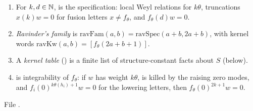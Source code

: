\begin{definition}\label{l26:def:ravfam}
\leavevmode
\begin{enumerate}
\item[(a)] For $k,d\in{\mathbb{N}}$,  is the specification: local Weyl relations for $k\theta$, truncations
$x(k)w=0$ for fusion letters $x\neq f_\theta$, and $f_\theta(d)w=0$.
\item[(b)] \emph{Ravinder's family} is $\mathrm{ravFam}(a,b)=\mathrm{ravSpec}(a+b,2a+b)$, with kernel words
$\mathrm{ravKw}(a,b)=[f_\theta(2a+b+1)]$.
\item[(c)] A \emph{kernel table} () is a finite list of structure-constant facts about $S$ (below).
\item[(d)] \textbf{} is integrability of $f_\theta$: if $w$ has weight $k\theta$, is killed by the raising
zero modes, and $f_i(0)^{k\theta(h_i)+1}w=0$ for the lowering letters, then $f_\theta(0)^{2k+1}w=0$.
\end{enumerate}
\end{definition}
\noindent File .
